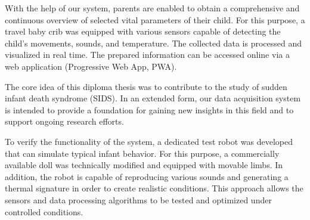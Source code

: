 With the help of our system, parents are enabled to obtain a comprehensive and continuous overview of selected vital parameters of their child.
For this purpose, a travel baby crib was equipped with various sensors capable of detecting the child’s movements, sounds, and temperature.
The collected data is processed and visualized in real time. The prepared information can be accessed online via a web application (Progressive Web App, PWA).
\par\vspace{1em}
\noindent
The core idea of this diploma thesis was to contribute to the study of sudden infant death syndrome (SIDS).
In an extended form, our data acquisition system is intended to provide a foundation for gaining new insights in this field and to support ongoing research efforts.
\par\vspace{1em}
\noindent
To verify the functionality of the system, a dedicated test robot was developed that can simulate typical infant behavior.
For this purpose, a commercially available doll was technically modified and equipped with movable limbs. In addition, the robot is capable of reproducing various sounds and generating a thermal signature in order to create realistic conditions.
This approach allows the sensors and data processing algorithms to be tested and optimized under controlled conditions.
\newpage